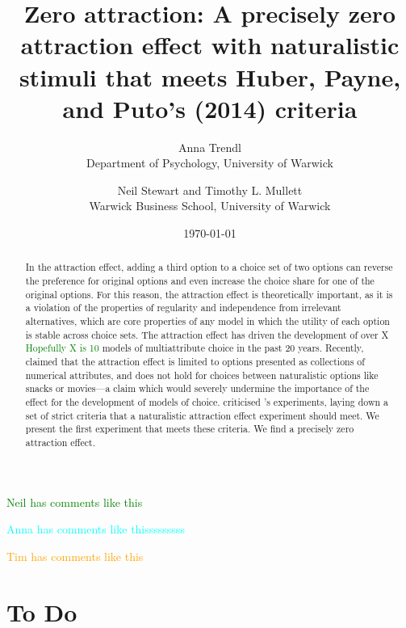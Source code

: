 \documentclass[12pt, a4paper]{article}
\title{}
\author{}
\date{}
\title{Zero attraction: A precisely zero attraction effect with naturalistic stimuli that meets Huber, Payne, and Puto's (2014) criteria}
\author{Anna Trendl\\Department of Psychology, University of Warwick \and Neil Stewart and Timothy L. Mullett\\Warwick Business School, University of Warwick}
\date{\today}
\newcommand{\NS}[1] {{\textcolor{green}{#1}}}
\newcommand{\AT}[1] {{\textcolor{cyan}{#1}}}
\newcommand{\TM}[1] {{\textcolor{orange}{#1}}}
\begin{document}
\begin{titlepage}
\maketitle

\newpage

\begin{abstract}
In the attraction effect, adding a third option to a choice set of two options can reverse the preference for original options and even increase the choice share for one of the original options. For this reason, the attraction effect is theoretically important, as it is a violation of the properties of regularity and independence from irrelevant alternatives, which are core properties of any model in which the utility of each option is stable across choice sets. The attraction effect has driven the development of over X \NS{Hopefully X is 10} models of multiattribute choice in the past 20 years. Recently,  claimed that the attraction effect is limited to options presented as collections of numerical attributes, and does not hold for choices between naturalistic options like snacks or movies---a claim which would severely undermine the importance of the effect for the development of models of choice.  criticised \citeauthor{Frederick2014}'s experiments, laying down a set of strict criteria that a naturalistic attraction effect experiment should meet. We present the first experiment that meets these criteria. We find a precisely zero attraction effect. 
\end{abstract}
\end{titlepage}

\NS{Neil has comments like this}

\AT{Anna has comments like thisssssssss}

\TM{Tim has comments like this}


\section{To Do}
\end{document}
